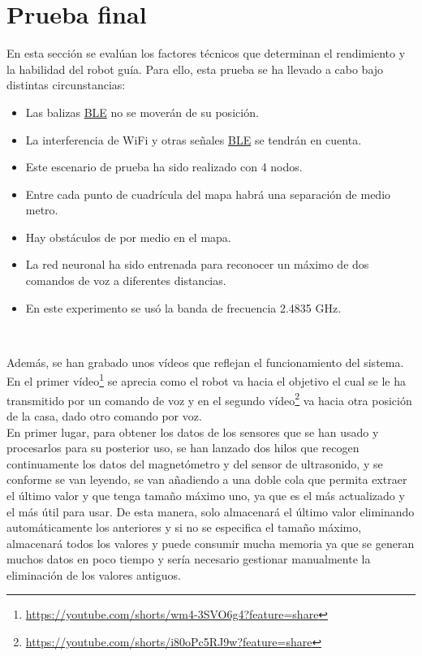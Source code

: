 \section{Prueba final}
\label{prueba_final}



En esta sección se evalúan los factores técnicos que determinan el rendimiento
y la habilidad del robot guía. Para ello, esta prueba se ha llevado a cabo bajo distintas circunstancias:

\begin{itemize}
 \item \textit{} Las balizas \hyperlink{BLE}{BLE}  no se moverán de su posición.
 \item \textit{} La interferencia de WiFi y otras señales \hyperlink{BLE}{BLE}  se tendrán en cuenta.
 \item \textit{} Este escenario de prueba ha sido realizado con 4 nodos.
 \item \textit{} Entre cada punto de cuadrícula del mapa habrá una separación de medio metro.
 \item \textit{} Hay obstáculos de por medio en el mapa.
 \item \textit{} La red neuronal ha sido entrenada para reconocer un máximo de dos comandos de voz a diferentes distancias.
 \item \textit{} En este experimento se usó la banda de frecuencia 2.4835 GHz.
\end{itemize}\


Además, se han grabado unos vídeos que reflejan el funcionamiento del sistema. En el primer vídeo\footnote{\url{https://youtube.com/shorts/wm4-3SVO6g4?feature=share}} se aprecia como el robot va hacia el objetivo el cual se le ha transmitido por un comando de voz y en el segundo vídeo\footnote{\url{https://youtube.com/shorts/i80oPc5RJ9w?feature=share}} va hacia otra posición de la casa, dado otro comando por voz.\\

En primer lugar, para obtener los datos de los sensores que se han usado y procesarlos para su posterior uso, se han lanzado dos hilos que recogen continuamente los datos del magnetómetro y del sensor de ultrasonido, y se conforme se van leyendo, se van añadiendo a una doble cola que permita extraer el último valor y que tenga tamaño máximo uno, ya que es el más actualizado y el más útil para usar. De esta manera, solo almacenará el último valor eliminando automáticamente los anteriores y si no se especifica el tamaño máximo, almacenará todos los valores y puede consumir mucha memoria ya que se generan muchos datos en poco tiempo y sería necesario gestionar manualmente la eliminación de los valores antiguos.\\

